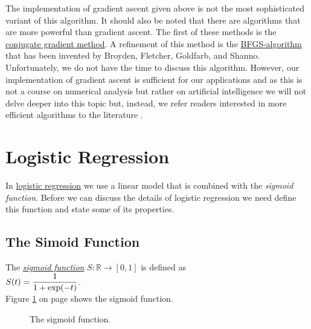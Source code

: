 The implementation of gradient ascent given above is not the most sophisticated variant of this algorithm.
It should also be noted that there are algorithms that are more powerful than
gradient ascent.  The first of these methods is the
\href{https://en.wikipedia.org/wiki/Conjugate_gradient_method}{conjugate gradient method}.  A
refinement of this method is the
\href{https://en.wikipedia.org/wiki/Broyden-Fletcher-Goldfarb-Shanno_algorithm}{BFGS-algorithm} that
has been invented by Broyden, Fletcher, Goldfarb, and Shanno.  Unfortunately, we do not have the
time to discuss this algorithm.
However, our implementation of gradient ascent is sufficient for our applications and as this is not a course on numerical
analysis but rather on artificial intelligence we will not delve deeper into this topic but, instead, we refer
readers interested in more efficient algorithms to the literature \cite{snyman:2005}.  

\section{Logistic Regression}
In \href{https://en.wikipedia.org/wiki/Logistic_regression}{logistic regression} we use a linear model that is combined
with the \emph{sigmoid function}.  Before we can discuss the details of logistic regression we need
define this function and state some of its properties. 

\subsection{The Simoid Function}
\begin{Definition}
The \href{https://en.wikipedia.org/wiki/Sigmoid_function}{\emph{sigmoid function}} $S: \mathbb{R} \rightarrow [0, 1]$ is defined as 
\\[0.2cm]
\hspace*{1.3cm}
$\displaystyle S(t) = \frac{1}{1 + \exp(-t)}$.  
\\[0.2cm]
Figure \ref{fig:sigmoid.eps} on page \pageref{fig:sigmoid.eps} shows the sigmoid function.
\eox
\end{Definition}

\begin{figure}[!ht]
\centering
{}
\vspace*{-0.3cm}
\caption{The sigmoid function.}
\label{fig:sigmoid.eps}
\end{figure}


